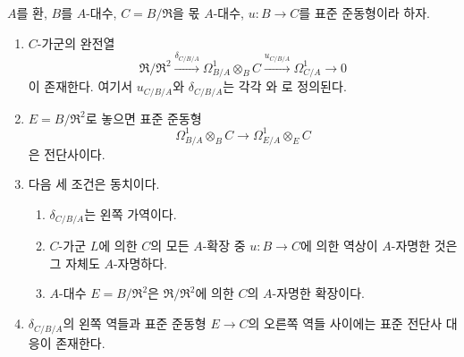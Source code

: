 \begin{theorem}[20.5.12]
\label{0.20.5.12-ko}
$A$를 환, $B$를 $A$-대수, $C=B/\mathfrak R$을 몫
$A$-대수, $u:B\to C$를 표준 준동형이라 하자.
\begin{enumerate}
  \item[\rm(i)] $C$-가군의 완전열
\begin{equation}
\tag{20.5.12.1}
\label{0.20.5.12.1-ko}
  \mathfrak R/\mathfrak R^2
  \xrightarrow{\delta_{C/B/A}}\Omega^1_{B/A}\otimes_B C
  \xrightarrow{u_{C/B/A}}\Omega^1_{C/A}\longrightarrow0
\end{equation}
이 존재한다. 여기서 $u_{C/B/A}$와 $\delta_{C/B/A}$는 각각
와 로 정의된다.
  \item[\rm(ii)] $E=B/\mathfrak R^2$로 놓으면 표준 준동형
\[
  \Omega^1_{B/A}\otimes_B C\longrightarrow
  \Omega^1_{E/A}\otimes_E C
\]
은 전단사이다.
  \item[\rm(iii)] 다음 세 조건은 동치이다.
  \begin{enumerate}
    \item[\rm a)] $\delta_{C/B/A}$는 왼쪽 가역이다.
    \item[\rm b)] $C$-가군 $L$에 의한 $C$의 모든 $A$-확장 중
    $u:B\to C$에 의한 역상이 $A$-자명한 것은 그 자체도
    $A$-자명하다.
    \item[\rm c)] $A$-대수 $E=B/\mathfrak R^2$은
    $\mathfrak R/\mathfrak R^2$에 의한 $C$의 $A$-자명한 확장이다.
  \end{enumerate}
  \item[\rm(iv)] $\delta_{C/B/A}$의 왼쪽 역들과 표준 준동형
  $E\to C$의 오른쪽 역들 사이에는 표준 전단사 대응이 존재한다.
\end{enumerate}
\end{theorem}

